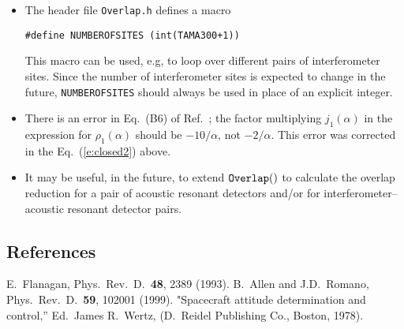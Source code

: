 \documentclass{article}
\begin{document}
\begin{itemize}
%
\item
The header file {\tt Overlap.h\/} defines a macro
%
\begin{verbatim}
#define NUMBEROFSITES (int(TAMA300+1))
\end{verbatim}
%
This macro can be used, e.g, to loop over different pairs of 
interferometer sites.
Since the number of interferometer sites is expected to change in the 
future, {\tt NUMBEROFSITES\/} should always be used in place of an 
explicit integer.
\item
There is an error in Eq.~(B6) of Ref.~\cite{flanagan}; 
the factor multiplying $j_1(\alpha)$ in the expression for 
$\rho_1(\alpha)$ should be $-10/\alpha$, not $-2/\alpha$.
This error was corrected in the Eq.~(\ref{e:closed2}) above.
\item
It may be useful, in the future, to extend ${\tt Overlap()\/}$ to 
calculate the overlap reduction for a pair of acoustic resonant
detectors and/or for interferometer--acoustic resonant detector pairs.
%
\end{itemize}

\subsection{References}

\begin{thebibliography}{0}
E.~Flanagan, 
Phys.\ Rev.\ D.\ {\bf 48}, 2389 (1993).
B.~Allen and J.D.~Romano, 
Phys.\ Rev.\ D.\ {\bf 59}, 102001 (1999).
"Spacecraft attitude determination and control,''  
Ed.\ James R.\ Wertz, 
(D.\ Reidel Publishing Co., Boston, 1978).
\end{thebibliography}
\end{document}
